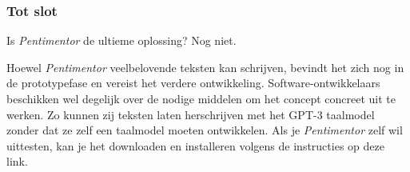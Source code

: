 \documentclass[a4paper,9pt,twoside]{report}
\begin{document}
\subsubsection{Tot slot}

\noindent Is \textit{Pentimentor} de ultieme oplossing? Nog niet. 

\medspace

\noindent Hoewel \textit{Pentimentor} veelbelovende teksten kan schrijven, bevindt het zich nog in de prototypefase en vereist het verdere ontwikkeling. Software-ontwikkelaars beschikken wel degelijk over de nodige middelen om het concept concreet uit te werken. Zo kunnen zij teksten laten herschrijven met het GPT-3 taalmodel zonder dat ze zelf een taalmodel moeten ontwikkelen. Als je \textit{Pentimentor} zelf wil uittesten, kan je het downloaden en installeren volgens de instructies op deze link.
\end{document}
